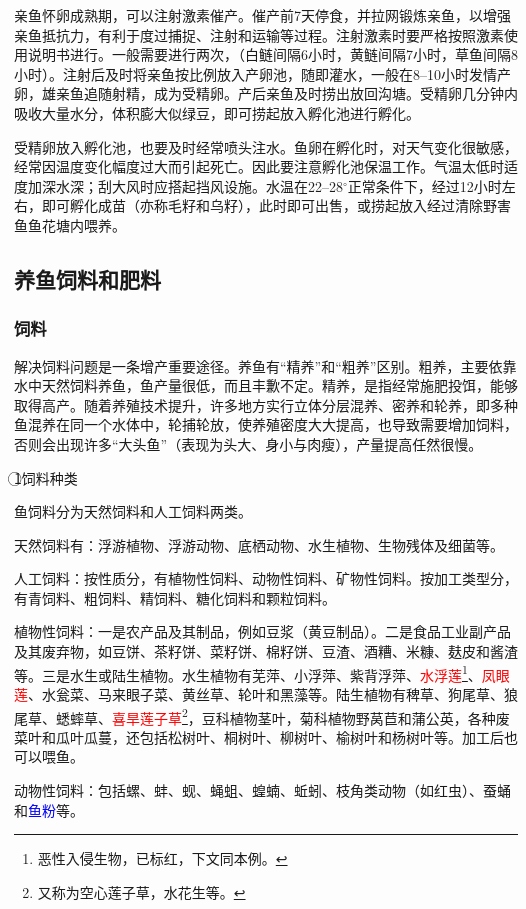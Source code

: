 \documentclass{ctexbook}
\begin{document}
亲鱼怀卵成熟期，可以注射激素催产。催产前7天停食，并拉网锻炼亲鱼，以增强亲鱼抵抗力，有利于度过捕捉、注射和运输等过程。注射激素时要严格按照激素使用说明书进行。一般需要进行两次，（白鲢间隔6小时，黄鲢间隔7小时，草鱼间隔8小时）。注射后及时将亲鱼按比例放入产卵池，随即灌水，一般在8--10小时发情产卵，雄亲鱼追随射精，成为受精卵。产后亲鱼及时捞出放回沟塘。受精卵几分钟内吸收大量水分，体积膨大似绿豆，即可捞起放入孵化池进行孵化。

受精卵放入孵化池，也要及时经常喷头注水。鱼卵在孵化时，对天气变化很敏感，经常因温度变化幅度过大而引起死亡。因此要注意孵化池保温工作。气温太低时适度加深水深；刮大风时应搭起挡风设施。水温在22--28$^\circ$正常条件下，经过12小时左右，即可孵化成苗（亦称毛籽和乌籽），此时即可出售，或捞起放入经过清除野害鱼鱼花塘内喂养。
\subsection{养鱼饲料和肥料}
\subsubsection{饲料}
解决饲料问题是一条增产重要途径。养鱼有“精养”和“粗养”区别。粗养，主要依靠水中天然饲料养鱼，鱼产量很低，而且丰歉不定。精养，是指经常施肥投饵，能够取得高产。随着养殖技术提升，许多地方实行立体分层混养、密养和轮养，即多种鱼混养在同一个水体中，轮捕轮放，使养殖密度大大提高，也导致需要增加饲料，否则会出现许多“大头鱼”（表现为头大、身小与肉瘦），产量提高任然很慢。

\textcircled{1}饲料种类

鱼饲料分为天然饲料和人工饲料两类。

天然饲料有：浮游植物、浮游动物、底栖动物、水生植物、生物残体及细菌等。

人工饲料：按性质分，有植物性饲料、动物性饲料、矿物性饲料。按加工类型分，有青饲料、粗饲料、精饲料、糖化饲料和颗粒饲料。

植物性饲料：一是农产品及其制品，例如豆浆（黄豆制品）。二是食品工业副产品及其废弃物，如豆饼、茶籽饼、菜籽饼、棉籽饼、豆渣、酒糟、米糠、麸皮和酱渣等。三是水生或陆生植物。水生植物有芜萍、小浮萍、紫背浮萍、\textcolor{red}{水浮莲}\footnote{恶性入侵生物，已标红，下文同本例。}、\textcolor{red}{凤眼莲}、水瓮菜、马来眼子菜、黄丝草、轮叶和黑藻等。陆生植物有稗草、狗尾草、狼尾草、蟋蟀草、\textcolor{red}{喜旱莲子草}\footnote{又称为空心莲子草，水花生等。}，豆科植物茎叶，菊科植物野莴苣和蒲公英，各种废菜叶和瓜叶瓜蔓，还包括松树叶、桐树叶、柳树叶、榆树叶和杨树叶等。加工后也可以喂鱼。

动物性饲料：包括螺、蚌、蚬、蝇蛆、蝗蝻、蚯蚓、枝角类动物（如红虫）、蚕蛹和\textcolor{blue}{鱼粉}等。
\end{document}
